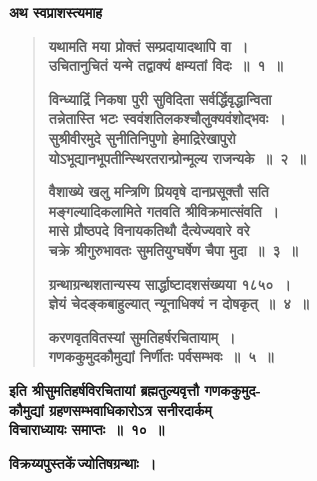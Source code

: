 \documentclass[11pt, openany]{book}
\begin{document}
\newpage

{\small \textbf{अथ स्वप्राशस्त्यमाह\textendash }}

\begin{quote}
{\large \textbf{{\color{purple}यथामति मया प्रोक्तं सम्प्रदायादथापि वा~।\\
उचितानुचितं यन्मे तद्वाक्यं क्षम्यतां विदः~॥~१~॥}}
\vspace{1mm}

\textbf{{\color{purple}विन्ध्याद्रिं निकषा पुरी सुविदिता सर्वर्द्धिवृद्धान्विता\\
तन्नेतास्ति भटः स्ववंशतिलकश्चौलुक्यवंशोद्भवः~।\\
सुश्रीवीरमुदे सुनीतिनिपुणो हेमाद्रिरेखापुरो\\
योऽभूद्यानभूपतीन्स्थिरतरान्प्रोन्मूल्य राजन्यके~॥~२~॥}}
\vspace{1mm}

\textbf{{\color{purple}वैशाख्ये खलु मन्त्रिणि प्रियवृषे दानप्रसूक्तौ सति\\
मङ्गल्यादिकलामिते गतवति श्रीविक्रमात्संवति~।\\
मासे प्रौष्ठपदे विनायकतिथौ दैत्येज्यवारे वरे\\
चक्रे श्रीगुरुभावतः सुमतियुग्घर्षेण चैपा मुदा~॥~३~॥}}
\vspace{1mm}

\textbf{{\color{purple}ग्रन्थाग्रन्थशतान्यस्य सार्द्धाष्टादशसंख्यया १८५०~।\\
ज्ञेयं चेदङ्कबाहुल्यात् न्यूनाधिक्यं न दोषकृत्~॥~४~॥}}
\vspace{1mm}

\textbf{{\color{purple}करणवृतवितस्यां सुमतिहर्षरचितायाम्~।\\
गणककुमुदकौमुद्यां निर्णीतः पर्वसम्भवः~॥~५~॥}}}
\end{quote}
\vspace{4mm}

\begin{center}
{\large \textbf{इति श्रीसुमतिहर्षविरचितायां ब्रह्मतुल्यवृत्तौ गणककुमुद-\\
कौमुद्यां ग्रहणसम्भवाधिकारोऽत्र सनीरदार्कम् \\
विचाराध्यायः समाप्तः~॥~१०~॥}}
\end{center}

\newpage
\thispagestyle{empty}

\begin{center}
{\large \textbf{विक्रय्यपुस्तकें\textendash \,ज्योतिषग्रन्थाः~।}}
\end{center}
\vspace{-2mm}
\end{document}
